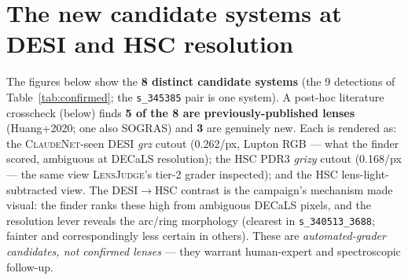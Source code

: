 \documentclass[11pt,letterpaper]{article}
\newcommand{\cnet}{\textsc{ClaudeNet}}
\newcommand{\lj}{\textsc{LensJudge}}
\begin{document}



\clearpage
\appendix
\section{The new candidate systems at DESI and HSC resolution}
\label{app:gallery}
The figures below show the \textbf{8 distinct candidate systems} (the 9 detections of
Table~\ref{tab:confirmed}; the \texttt{s\_345385} pair is one system). A post-hoc literature crosscheck
(below) finds \textbf{5 of the 8 are previously-published lenses} (Huang+2020; one also SOGRAS) and
\textbf{3} are genuinely new. Each is rendered as: the
\cnet{}-seen DESI \emph{grz} cutout (0.262\arcsec/px, Lupton RGB --- what the finder scored, ambiguous
at DECaLS resolution); the HSC PDR3 \emph{grizy} cutout (0.168\arcsec/px --- the same view \lj{}'s
tier-2 grader inspected); and the HSC lens-light-subtracted view. The DESI$\to$HSC contrast is the
campaign's mechanism made visual: the finder ranks these high from ambiguous DECaLS pixels, and the
resolution lever reveals the arc/ring morphology (clearest in \texttt{s\_340513\_3688}; fainter and
correspondingly less certain in others). These are \emph{automated-grader candidates, not confirmed
lenses} --- they warrant human-expert and spectroscopic follow-up.


\clearpage
\end{document}
